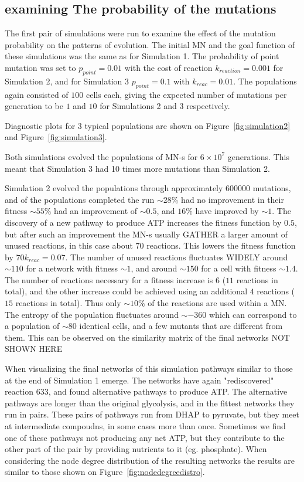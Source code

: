 \documentclass[10pt,a4paper]{article}
\begin{document}
\subsection{examining The probability of the mutations}
\label{sub:the_probability_of_the_mutations}

The first pair of simulations were run to examine the effect of the mutation probability on the patterns of evolution. The initial MN and the goal function of these simulations was the same as for Simulation 1. The probability of point mutation was set to $p_{point}=0.01$ with the cost of reaction $k_{reaction}=0.001$ for Simulation 2, and for Simulation 3 $p_{point}=0.1$ with $k_{reac}=0.01$. The populations again consisted of $100$ cells each, giving the expected number of mutations per generation to be $1$ and $10$ for Simulations 2 and 3 respectively. 

Diagnostic plots for $3$ typical populations are shown on Figure~\ref{fig:simulation2} and Figure~\ref{fig:simulation3}.

Both simulations evolved the populations of MN-s for $6\times 10^7$ generations. This meant that Simulation 3 had 10 times more mutations than Simulation 2. 

Simulation 2 evolved the populations through approximately $600 000$ mutations, and of the populations completed the run $\sim 28 \%$ had no improvement in their fitness $\sim 55 \%$ had an improvement of $\sim 0.5$, and $16 \%$ have improved by $\sim 1$. The discovery of a new pathway to produce ATP increases the fitness function by $0.5$, but after such an improvement the MN-s usually GATHER a larger amount of unused reactions, in this case about $70$ reactions. This lowers the fitness function by $70 k_{reac}=0.07$. The number of unused reactions fluctuates WIDELY around $\sim 110$ for a network with fitness $\sim 1$, and around $\sim 150$ for a cell with fitness $\sim 1.4$. The number of reactions necessary for a fitness increase is $6$ ($11$ reactions in total), and the other increase could be achieved using an additional $4$ reactions ($15$ reactions in total). Thus only $\sim 10\%$ of the reactions are used within a MN.  The entropy of the population fluctuates around $\sim -360$ which can correspond to a population of $\sim 80$ identical cells, and a few mutants that are different from them. This can be observed on the similarity matrix of the final networks NOT SHOWN HERE

When visualizing the final networks of this simulation pathways similar to those at the end of Simulation 1 emerge. The networks have again "rediscovered" reaction $633$, and found alternative pathways to produce ATP. The alternative pathways are longer than the original glycolysis, and in the fittest networks they run in pairs. These pairs of pathways run from DHAP to pyruvate, but they meet at intermediate compoudns, in some cases more than once. Sometimes we find one of these pathways not producing any net ATP, but they contribute to the other part of the pair by providing nutrients to it (eg. phosphate). When considering the node degree distribution of the resulting networks the results are similar to those shown on Figure~\ref{fig:nodedegreedistro}. 
\end{document}
